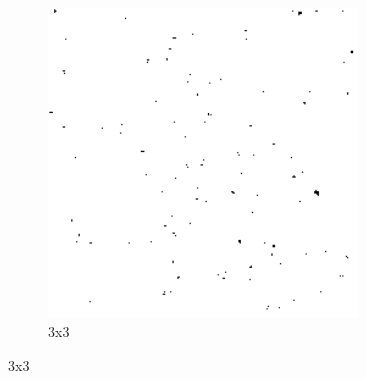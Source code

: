 \begin{figure}[h]
\begin{subfigure}{0.3\textwidth}
        \includegraphics[width=0.9\textwidth]{../code/2_out/2-2_sp_3x3.png}
        \caption{3x3}
        \label{fig:2-2-1:2}
    \end{subfigure}


\end{figure}
